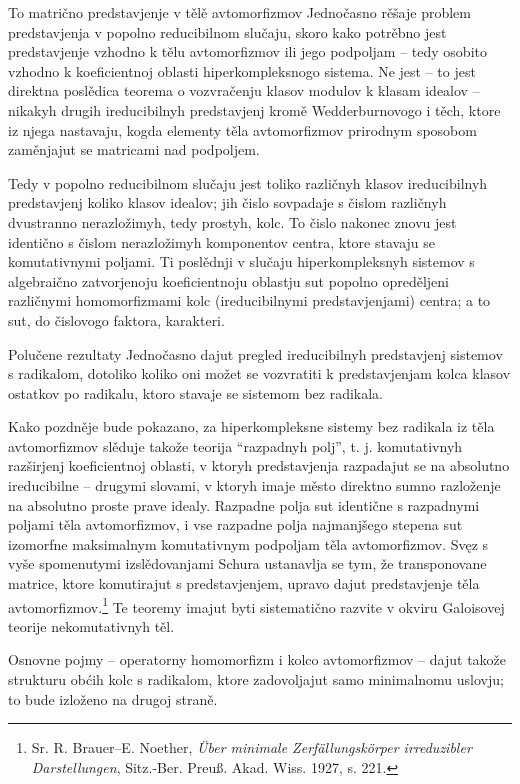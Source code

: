 \documentclass[11pt]{article}
\begin{document}
To matrično predstavjenje v tělě avtomorfizmov Jednočasno rěšaje problem predstavjenja v popolno reducibilnom slučaju, skoro kako potrěbno jest predstavjenje vzhodno k tělu avtomorfizmov ili jego podpoljam -- tedy osobito vzhodno k koeficientnoj oblasti hiperkompleksnogo sistema. Ne jest -- to jest direktna poslědica teorema o vozvračenju klasov modulov k klasam idealov -- nikakyh drugih ireducibilnyh predstavjenj kromě Wedderburnovogo i těch, ktore iz njega nastavaju, kogda elementy těla avtomorfizmov prirodnym sposobom zaměnjajut se matricami nad podpoljem.

Tedy v popolno reducibilnom slučaju jest toliko različnyh klasov ireducibilnyh predstavjenj koliko klasov idealov; jih čislo sovpadaje s čislom različnyh dvustranno nerazložimyh, tedy prostyh, kolc. To čislo nakonec znovu jest identično s čislom nerazložimyh komponentov centra, ktore stavaju se komutativnymi poljami. Ti poslědnji v slučaju hiperkompleksnyh sistemov s algebraično zatvorjenoju koeficientnoju oblastju sut popolno opreděljeni različnymi homomorfizmami kolc (ireducibilnymi predstavjenjami) centra; a to sut, do čislovogo faktora, karakteri.

Polučene rezultaty Jednočasno dajut pregled ireducibilnyh predstavjenj sistemov s radikalom, dotoliko koliko oni možet se vozvratiti k predstavjenjam kolca klasov ostatkov po radikalu, ktoro stavaje se sistemom bez radikala.

Kako pozdněje bude pokazano, za hiperkompleksne sistemy bez radikala iz těla avtomorfizmov slěduje takože teorija “razpadnyh polj”, t. j. komutativnyh razširjenj koeficientnoj oblasti, v ktoryh predstavjenja razpadajut se na absolutno ireducibilne -- drugymi slovami, v ktoryh imaje město direktno sumno razloženje na absolutno proste prave idealy. Razpadne polja sut identične s razpadnymi poljami těla avtomorfizmov, i vse razpadne polja najmanjšego stepena sut izomorfne maksimalnym komutativnym podpoljam těla avtomorfizmov. Svęz s vyše spomenutymi izslědovanjami Schura ustanavlja se tym, že transponovane matrice, ktore komutirajut s predstavjenjem, upravo dajut predstavjenje těla avtomorfizmov.\footnote{Sr. R. Brauer--E. Noether, \emph{Über minimale Zerfällungskörper irreduzibler Darstellungen}, Sitz.-Ber. Preuß. Akad. Wiss. 1927, s. 221.} Te teoremy imajut byti sistematično razvite v okviru Galoisovej teorije nekomutativnyh těl.

Osnovne pojmy -- operatorny homomorfizm i kolco avtomorfizmov -- dajut takože strukturu obćih kolc s radikalom, ktore zadovoljajut samo minimalnomu uslovju; to bude izloženo na drugoj straně.
\end{document}

